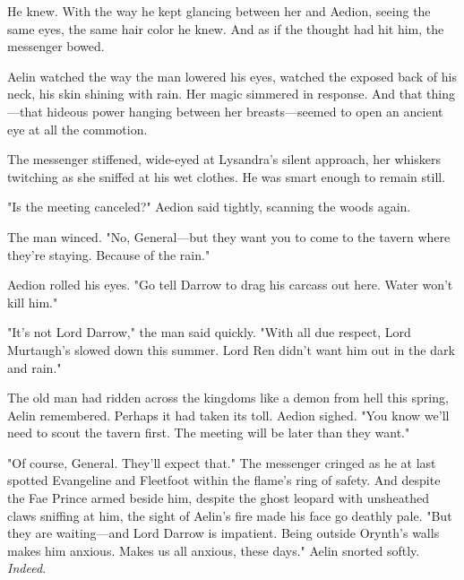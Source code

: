 He knew. With the way he kept glancing between her and Aedion, seeing the same eyes, the same hair color  he knew. And as if the thought had hit him, the messenger bowed.

Aelin watched the way the man lowered his eyes, watched the exposed back of his neck, his skin shining with rain. Her magic simmered in response. And that thing---that hideous power hanging between her breasts---seemed to open an ancient eye at all the commotion.

The messenger stiffened, wide-eyed at Lysandra's silent approach, her whiskers twitching as she sniffed at his wet clothes. He was smart enough to remain still.

"Is the meeting canceled?" Aedion said tightly, scanning the woods again.

The man winced. "No, General---but they want you to come to the tavern where they're staying. Because of the rain."

Aedion rolled his eyes. "Go tell Darrow to drag his carcass out here. Water won't kill him."

"It's not Lord Darrow," the man said quickly. "With all due respect, Lord Murtaugh's slowed down this summer. Lord Ren didn't want him out in the dark and rain."

The old man had ridden across the kingdoms like a demon from hell this spring, Aelin remembered. Perhaps it had taken its toll. Aedion sighed. "You know we'll need to scout the tavern first. The meeting will be later than they want."

"Of course, General. They'll expect that." The messenger cringed as he at last spotted Evangeline and Fleetfoot within the flame's ring of safety. And despite the Fae Prince armed beside him, despite the ghost leopard with unsheathed claws sniffing at him, the sight of Aelin's fire made his face go deathly pale. "But they are waiting---and Lord Darrow is impatient. Being outside Orynth's walls makes him anxious. Makes us all anxious, these days." Aelin snorted softly. \emph{Indeed.}

